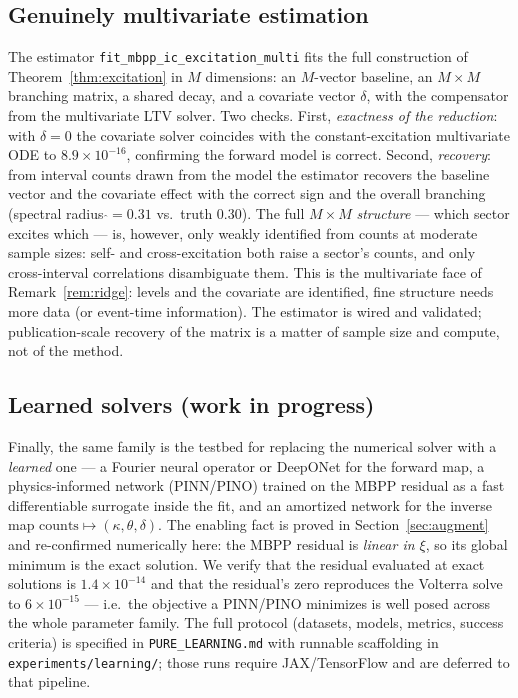 \documentclass[11pt]{article}
\theoremstyle{plain}
\theoremstyle{definition}
\theoremstyle{remark}
\newcommand{\code}[1]{\texttt{#1}}
\begin{document}
\subsection{Genuinely multivariate estimation}
\label{sec:multifit}

The estimator \code{fit\_mbpp\_ic\_excitation\_multi} fits the full
construction of Theorem~\ref{thm:excitation} in $M$ dimensions: an $M$-vector
baseline, an $M\times M$ branching matrix, a shared decay, and a covariate vector
$\delta$, with the compensator from the multivariate LTV solver. Two checks. First,
\emph{exactness of the reduction}: with $\delta=0$ the covariate solver coincides
with the constant-excitation multivariate ODE to $8.9\times10^{-16}$, confirming the
forward model is correct. Second, \emph{recovery}: from interval counts drawn from
the model the estimator recovers the baseline vector and the covariate effect with
the correct sign and the overall branching (spectral radius $\hat{}=0.31$ vs.\
truth $0.30$). The full $M\times M$ \emph{structure} --- which sector excites which
--- is, however, only weakly identified from counts at moderate sample sizes: self-
and cross-excitation both raise a sector's counts, and only cross-interval
correlations disambiguate them. This is the multivariate face of
Remark~\ref{rem:ridge}: levels and the covariate are identified, fine structure
needs more data (or event-time information). The estimator is wired and validated;
publication-scale recovery of the matrix is a matter of sample size and compute, not
of the method.

\subsection{Learned solvers (work in progress)}
\label{sec:learned}

Finally, the same family is the testbed for replacing the numerical solver with a
\emph{learned} one --- a Fourier neural operator or DeepONet for the forward map, a
physics-informed network (PINN/PINO) trained on the MBPP residual as a fast
differentiable surrogate inside the fit, and an amortized network for the inverse
map $\text{counts}\mapsto(\kappa,\theta,\delta)$. The enabling fact is proved in
Section~\ref{sec:augment} and re-confirmed numerically here: the MBPP residual is
\emph{linear in $\xi$}, so its global minimum is the exact solution. We verify that
the residual evaluated at exact solutions is $1.4\times10^{-14}$ and that the
residual's zero reproduces the Volterra solve to $6\times10^{-15}$ --- i.e.\ the
objective a PINN/PINO minimizes is well posed across the whole parameter family.
The full protocol (datasets, models, metrics, success criteria) is specified in
\code{PURE\_LEARNING.md} with runnable scaffolding in \code{experiments/learning/};
those runs require JAX/TensorFlow and are deferred to that pipeline.
\end{document}
